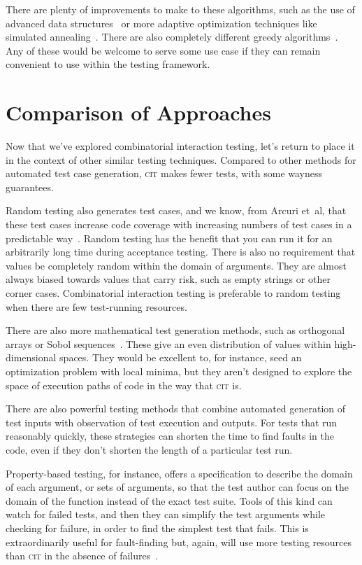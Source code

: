 \documentclass{juliacon}
\newcommand{\cit}{\textsc{cit}\xspace}
\begin{document}
\vskip 6pt
There are plenty of improvements to make to these algorithms, such as the use of advanced data structures~\cite{Segall2011-jv} or more adaptive optimization techniques like simulated annealing~\cite{Petke2015-ex}. There are also completely different greedy algorithms~\cite{Calvagna2012-ic,Koc2018-vs}. Any of these would be welcome to serve some use case if they can remain convenient to use within the testing framework.


\section{Comparison of Approaches}\label{sec:comparison}

Now that we've explored combinatorial interaction testing, let's return to place it in the context of other similar testing techniques. Compared to other methods for automated test case generation, \cit makes fewer tests, with some wayness guarantees.

\vskip 6pt
Random testing also generates test cases, and we know, from Arcuri et~al, that these test cases increase code coverage with increasing numbers of test cases in a predictable way~\cite{Arcuri2012-az}. Random testing has the benefit that you can run it for an arbitrarily long time during acceptance testing. There is also no requirement that values be completely random within the domain of arguments. They are almost always biased towards values that carry risk, such as empty strings or other corner cases. Combinatorial interaction testing is preferable to random testing when there are few test-running resources.

\vskip 6pt
There are also more mathematical test generation methods, such as orthogonal arrays or Sobol sequences~\cite{He2013-th}. These give an even distribution of values within high-dimensional spaces. They would be excellent to, for instance, seed an optimization problem with local minima, but they aren't designed to explore the space of execution paths of code in the way that \cit is.

\vskip 6pt
There are also powerful testing methods that combine automated generation of test inputs with observation of test execution and outputs. For tests that run reasonably quickly, these strategies can shorten the time to find faults in the code, even if they don't shorten the length of a particular test run.

\vskip 6pt
Property-based testing, for instance, offers a specification to describe the domain of each argument, or sets of arguments, so that the test author can focus on the domain of the function instead of the exact test suite. Tools of this kind can watch for failed tests, and then they can simplify the test arguments while checking for failure, in order to find the simplest test that fails. This is extraordinarily useful for fault-finding but, again, will use more testing resources than \cit in the absence of failures~\cite{loscher2018automating}.
\end{document}
